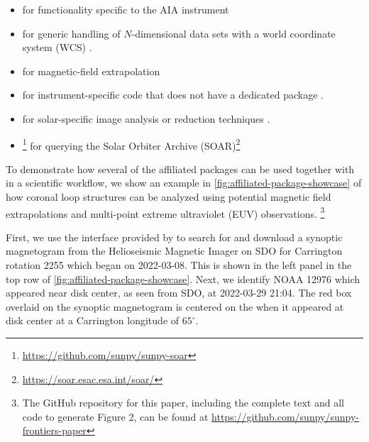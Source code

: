 \begin{itemize}
    \item \aiapypkg for functionality specific to the AIA instrument \citep{barnes_aiapy_2020}
    \item {} for generic handling of $N$-dimensional data sets with a world coordinate system (WCS) \citep{danryanirish_2021_5715161}.
    \item {} for magnetic-field extrapolation \citep{stansby_pfsspy_2020}
    \item {} for instrument-specific code that does not have a dedicated package \citep{danryanirish_2022_7190661}.
    \item {} for solar-specific image analysis or reduction techniques \citep{nabil_freij_2022_6578722}.
    \item {}\footnote{\url{https://github.com/sunpy/sunpy-soar}} for querying the Solar Orbiter Archive (SOAR)\footnote{\url{https://soar.esac.esa.int/soar/}}
\end{itemize}

To demonstrate how several of the affiliated packages can be used together with \sunpypkg in a scientific workflow, we show an example in \autoref{fig:affiliated-package-showcase} of how coronal loop structures can be analyzed using potential magnetic field extrapolations and multi-point extreme ultraviolet (EUV) observations.
\footnote{The GitHub repository for this paper, including the complete text and all code to generate Figure 2, can be found at \url{https://github.com/sunpy/sunpy-frontiers-paper}}

First, we use the \Fido interface provided by \sunpypkg to search for and download a synoptic magnetogram from the Helioseismic Magnetic Imager \citep[HMI,][]{scherrer_helioseismic_2012} on SDO for Carrington rotation 2255 which began on 2022-03-08.
This is shown in the left panel in the top row of \autoref{fig:affiliated-package-showcase}.
Next, we identify \AR NOAA 12976 which appeared near disk center, as seen from SDO, at 2022-03-29 21:04.
The red box overlaid on the synoptic magnetogram is centered on the \AR when it appeared at disk center at a Carrington longitude of $65^\circ$.

